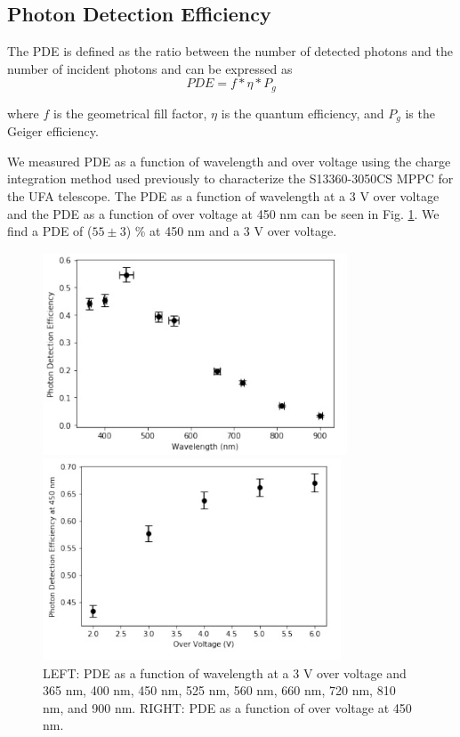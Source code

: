 \documentclass{article}
\begin{document}
\subsection{Photon Detection Efficiency}
The PDE is defined as the ratio between the number of detected photons and the number of incident photons
and can be expressed as
\begin{equation}
    PDE = f * \eta * P_g
\end{equation}

where $f$ is the geometrical fill factor, $\eta$ is the quantum efficiency, and $P_g$ is the Geiger efficiency.

We measured PDE as a function of wavelength and over voltage using the charge integration method used
previously to characterize the S13360-3050CS MPPC for the UFA telescope.\cite{li2019characterization} The PDE as a function of
wavelength at a 3 V over voltage and the PDE as a function of over voltage at 450 nm can be seen in Fig. \ref{fig:PDE}.
We find a PDE of ($55 \pm 3$) \% at 450 nm and a 3 V over voltage.

\begin{figure}[ht]

  \begin{minipage}[b]{0.49\textwidth}
    \centering     
    \includegraphics[height=6cm]{images/figura6.jpg}
  \end{minipage}
  \hfill
  \begin{minipage}[b]{0.49\textwidth}
    \centering     
    \includegraphics[height=6cm]{images/figura7.jpg}
  \end{minipage}
     
\caption{LEFT: PDE as a function of wavelength at a 3 V over voltage and 365 nm, 400 nm, 450 nm, 525 nm, 560 nm,
660 nm, 720 nm, 810 nm, and 900 nm. RIGHT: PDE as a function of over voltage at 450 nm.}
\label{fig:PDE}
    
\end{figure}
\end{document}
